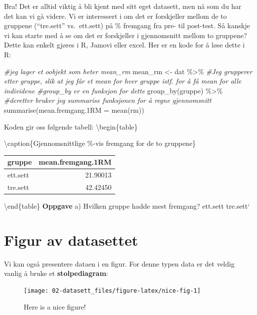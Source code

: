 \documentclass[
]{book}
\newenvironment{Shaded}{\begin{snugshade}}{\end{snugshade}}
\newcommand{\AttributeTok}[1]{\textcolor[rgb]{0.77,0.63,0.00}{#1}}
\newcommand{\CommentTok}[1]{\textcolor[rgb]{0.56,0.35,0.01}{\textit{#1}}}
\newcommand{\FunctionTok}[1]{\textcolor[rgb]{0.00,0.00,0.00}{#1}}
\newcommand{\NormalTok}[1]{#1}
\newcommand{\OtherTok}[1]{\textcolor[rgb]{0.56,0.35,0.01}{#1}}
\newcommand{\SpecialCharTok}[1]{\textcolor[rgb]{0.00,0.00,0.00}{#1}}
\begin{document}
Bra! Det er alltid viktig å bli kjent med sitt eget datasett, men nå som du har det kan vi gå videre. Vi er interessert i om det er forskjeller mellom de to gruppene (``tre.sett'' vs.~ett.sett) på \% fremgang fra pre- til post-test. Så kanskje vi kan starte med å se om det er forskjeller i gjennomsnitt mellom to gruppene? Dette kan enkelt gjøres i R, Jamovi eller excel. Her er en kode for å løse dette i R:

\begin{Shaded}
\begin{Highlighting}[]
\CommentTok{\#jeg lager et oobjekt som heter mean\_rm }
\NormalTok{mean\_rm }\OtherTok{\textless{}{-}}\NormalTok{ dat }\SpecialCharTok{\%\textgreater{}\%}
  \CommentTok{\#Jeg grupperer etter gruppe, slik at jeg får et mean for hver gruppe istf. for å få mean for alle individene}
  \CommentTok{\#group\_by er en funksjon for dette}
  \FunctionTok{group\_by}\NormalTok{(gruppe) }\SpecialCharTok{\%\textgreater{}\%}
  \CommentTok{\#deretter bruker jeg summarise funksjonen for å regne gjennomsnitt}
  \FunctionTok{summarise}\NormalTok{(}\AttributeTok{mean.fremgang.1RM =} \FunctionTok{mean}\NormalTok{(rm))}
\end{Highlighting}
\end{Shaded}

Koden gir oss følgende tabell:
\textbackslash begin\{table\}

\textbackslash caption\{\label{tab:unnamed-chunk-6}Gjennomsnittlige \%-vis fremgang for de to gruppene\}
\centering

\begin{tabular}[t]{lr}
\toprule
gruppe & mean.fremgang.1RM\\
\midrule
ett.sett & 21.90013\\
tre.sett & 42.42450\\
\bottomrule
\end{tabular}

\textbackslash end\{table\}
\textbf{Oppgave}
a) Hvilken gruppe hadde mest fremgang?
ett.sett tre.sett`

\hypertarget{figur-av-datasettet}{%
\section{Figur av datasettet}\label{figur-av-datasettet}}

Vi kan også presentere dataen i en figur. For denne typen data er det veldig vanlig å bruke et \textbf{stolpediagram}:

\begin{figure}

{\centering \texttt{[image: 02-datasett\_files/figure-latex/nice-fig-1]} 

}

\caption{Here is a nice figure!}\label{fig:nice-fig}
\end{figure}
\end{document}
